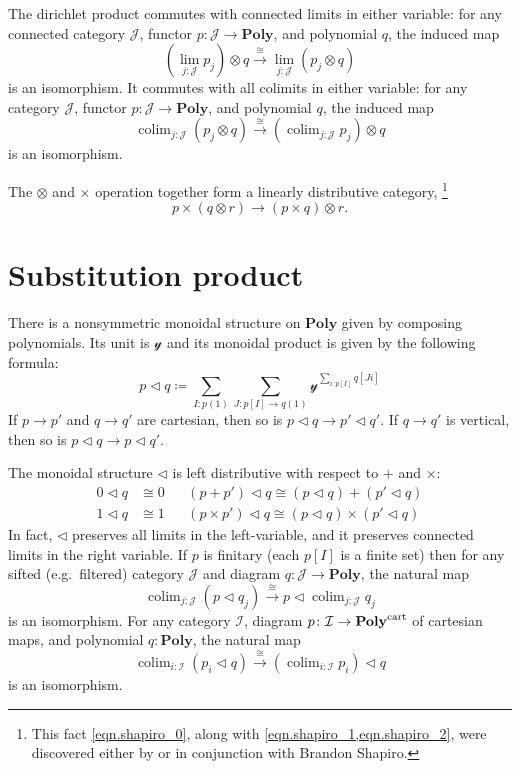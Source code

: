 \documentclass[11pt, one side, article]{memoir}
\theoremstyle{definition}
\theoremstyle{plain}
\DeclareMathOperator*{\colim}{colim}
\newcommand{\cat}[1]{\mathcal{#1}}%
\newcommand{\Cat}[1]{\mathbf{#1}}%
\newcommand{\To}[2][]{\xrightarrow[#1]{#2}}
\newcommand{\tn}[1]{\textnormal{#1}}
\newcommand{\yon}{\mathcal{y}}
\newcommand{\poly}{\Cat{Poly}}
\newcommand{\polycart}{\poly^{\tn{cart}}}
\newcommand{\0}{\textsf{0}}
\newcommand{\1}{\tn{\textsf{1}}}
\newcommand{\tri}{\mathbin{\triangleleft}}
\begin{document}
The dirichlet product commutes with connected limits in either variable: for any connected category $\cat{J}$, functor $p\colon\cat{J}\to\poly$, and polynomial $q$, the induced map
\begin{equation}
	\left(\lim_{j:\cat{J}}p_j\right)\otimes q
	\To{\cong}
	\lim_{j:\cat{J}}(p_j\otimes q)
\end{equation}
is an isomorphism. It commutes with all colimits in either variable: for any category $\cat{J}$, functor $p\colon\cat{J}\to\poly$, and polynomial $q$, the induced map
\begin{equation}
	\colim_{j:\cat{J}}(p_j\otimes q)
	\To{\cong}
	\left(\colim_{j:\cat{J}}p_j\right)\otimes q
\end{equation}
is an isomorphism.

The $\otimes$ and $\times$ operation together form a linearly distributive category,%
\footnote{This fact \eqref{eqn.shapiro_0}, along with \cref{eqn.shapiro_1,eqn.shapiro_2}, were discovered either by or in conjunction with Brandon Shapiro.}
\begin{equation}\label{eqn.shapiro_0}
p\times(q\otimes r)\to (p\times q)\otimes r.
\end{equation}

\chapter{Substitution product}

There is a nonsymmetric monoidal structure on $\poly$ given by composing polynomials. Its unit is $\yon$ and its monoidal product is given by the following formula:
\begin{equation}
p\tri q\coloneqq\sum_{I: p(1)}\sum_{J\colon p[I]\to q(1)}\yon^{\sum\limits_{i: p[I]}q[Ji]}
\end{equation}
If $p\to p'$ and $q\to q'$ are cartesian, then so is $p\tri q\to p'\tri q'$. If $q\to q'$ is vertical, then so is $p\tri q\to p\tri q'$.

The monoidal structure $\tri$ is left distributive with respect to $+$ and $\times$:
\begin{align}
	0\tri q&\cong 0&&(p+p')\tri q\cong (p\tri q)+(p'\tri q)\label{eqn.comp_plus}\\
	1\tri q&\cong 1&&(p\times p')\tri q\cong (p\tri q)\times(p'\tri q)\label{eqn.comp_times}
\end{align}
In fact, $\tri$ preserves all limits in the left-variable, and it preserves connected limits in the right variable. If $p$ is finitary (each $p[I]$ is a finite set) then for any sifted (e.g.\ filtered) category $\cat{J}$ and diagram $q\colon \cat{J}\to\poly$, the natural map
\begin{equation}\label{eqn.finitary_tri_sifted}
  \colim_{j: \cat{J}}(p\tri q_j)
  \To{\cong}
	p\tri\colim_{j: \cat{J}}q_j
\end{equation}
is an isomorphism. For any category $\cat{I}$, diagram $p\colon \cat{I}\to\polycart$ of cartesian maps, and polynomial $q:\poly$, the natural map
\begin{equation}\label{eqn.cart_tri}
	\colim_{i: \cat{I}}(p_i\tri q)
	\To{\cong}
	(\colim_{i: \cat{I}}p_i)\tri q
\end{equation}
is an isomorphism.
\end{document}
